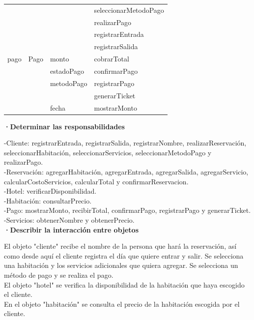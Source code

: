 \documentclass[12pt]{article}
\begin{document}
\begin{table}[H]
\begin{tabular}{|l|l|l|l|}
 & & & seleccionarMetodoPago \\
 & & & realizarPago \\
 & & & registrarEntrada \\
 & & & registrarSalida \\ \hline
pago & Pago & monto & cobrarTotal \\
 & & estadoPago            & confirmarPago \\
 & & metodoPago & registrarPago \\
 & & & generarTicket\\
 & & fecha & mostrarMonto\\ \hline
\end{tabular}
\end{table}

\textbf{·Determinar las responsabilidades}

-Cliente: registrarEntrada, registrarSalida, registrarNombre, realizarReservación, seleccionarHabitación, seleccionarServicios, seleccionarMetodoPago y realizarPago. \\

-Reservación: agregarHabitación, agregarEntrada, agregarSalida, agregarServicio, calcularCostoServicios, calcularTotal y confirmarReservacion. \\

-Hotel: verificarDisponibilidad. \\

-Habitación: consultarPrecio. \\

-Pago: mostrarMonto, recibirTotal, confirmarPago, registrarPago y generarTicket. \\

-Servicios: obtenerNombre y obtenerPrecio. \\

\textbf{·Describir la interacción entre objetos}

El objeto "cliente" recibe el nombre de la persona que hará la reservación, así como desde aquí el cliente registra el día que quiere entrar y salir. Se selecciona una habitación y los servicios adicionales que quiera agregar. Se selecciona un método de pago y se realiza el pago. \\

El objeto "hotel" se verifica la disponibilidad de la habitación que haya escogido el cliente. \\

En el objeto "habitación" se consulta el precio de la habitación escogida por el cliente. \\
\end{document}
